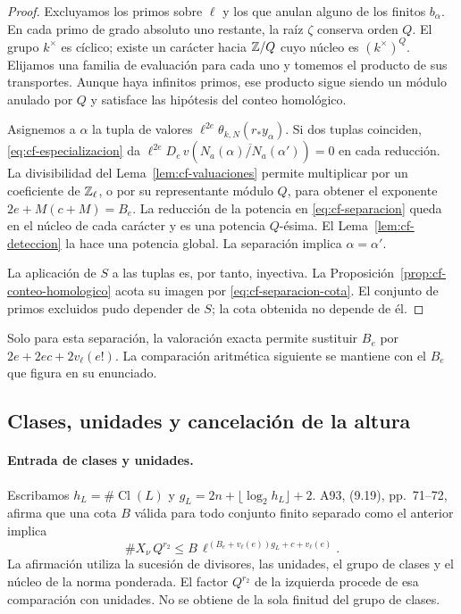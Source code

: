 \begin{proof}
Excluyamos los primos sobre $\ell$ y los que anulan alguno
de los finitos $b_\alpha$. En cada primo de grado absoluto uno
restante, la raíz $\zeta$ conserva orden $Q$.
El grupo $k^\times$ es cíclico; existe un carácter hacia
$\mathbb{Z}/Q$ cuyo núcleo es $(k^\times)^Q$.
Elijamos una familia de evaluación para cada uno y tomemos el
producto de sus transportes. Aunque haya infinitos primos,
ese producto sigue siendo un módulo anulado por $Q$ y satisface
las hipótesis del conteo homológico.

Asignemos a $\alpha$ la tupla de valores
$\ell^{2e}\theta_{k,N}(r_*y_\alpha)$.
Si dos tuplas coinciden, \eqref{eq:cf-especializacion} da
$\ell^{2e}D_e\,v(\overline{N_a(\alpha)/N_a(\alpha')})=0$
en cada reducción. La divisibilidad del
Lema~\ref{lem:cf-valuaciones} permite multiplicar por un
coeficiente de $\mathbb{Z}_\ell$, o por su representante módulo $Q$,
para obtener el exponente
$2e+M(c+M)=B_e$.
La reducción de la potencia en \eqref{eq:cf-separacion} queda
en el núcleo de cada carácter y es una potencia $Q$-ésima.
El Lema~\ref{lem:cf-deteccion} la hace una potencia global.
La separación implica $\alpha=\alpha'$.

La aplicación de $S$ a las tuplas es, por tanto, inyectiva.
La Proposición~\ref{prop:cf-conteo-homologico} acota su imagen
por \eqref{eq:cf-separacion-cota}. El conjunto de primos
excluidos pudo depender de $S$; la cota obtenida no depende de él.
\end{proof}

Solo para esta separación, la valoración exacta permite sustituir
$B_e$ por $2e+2ec+2v_\ell(e!)$. La comparación aritmética
siguiente se mantiene con el $B_e$ que figura en su enunciado.

\subsection{Clases, unidades y cancelación de la altura}

\paragraph{Entrada de clases y unidades.}
Escribamos $h_L=\#\operatorname{Cl}(L)$ y
$g_L=2n+\lfloor\log_2 h_L\rfloor+2$.
A93, (9.19), pp.~71--72, afirma que una cota $B$ válida para
todo conjunto finito separado como el anterior implica
\begin{equation}
 \#X_\nu\,Q^{r_2}
 \le B\,\ell^{(B_e+v_\ell(e))g_L+c+v_\ell(e)}.
 \label{eq:cf-clases-entrada}
\end{equation}
La afirmación utiliza la sucesión de divisores, las unidades,
el grupo de clases y el núcleo de la norma ponderada. El factor
$Q^{r_2}$ de la izquierda procede de esa comparación con unidades.
No se obtiene de la sola finitud del grupo de clases.


